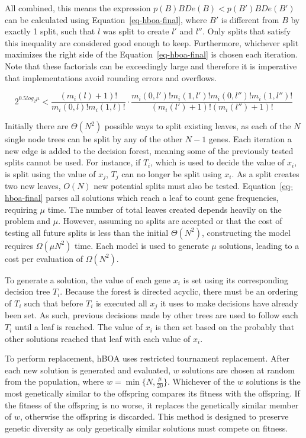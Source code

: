 \documentclass[twoside]{article}
\begin{document}
All combined, this means the expression $p(B)BDe(B) < p(B')BDe(B')$ can be calculated using Equation~\ref{eq-hboa-final},
where $B'$ is different from $B$ by exactly 1 split, such that $l$ was split to create $l'$ and $l''$. Only splits that
satisfy this inequality are considered good enough to keep. Furthermore, whichever split maximizes the right side of the
Equation~\ref{eq-hboa-final} is chosen each iteration. Note that these factorials can be exceedingly large and
therefore it is imperative that implementations avoid rounding errors and overflows.

\begin{equation}
  2^{0.5 log_2\mu} < \frac{(m_i(l) + 1)!}{m_i(0, l)!m_i(1,l)!} \cdot
  \frac{m_i(0, l')!m_i(1,l')!m_i(0, l'')!m_i(1,l'')!}{(m_i(l') + 1)!(m_i(l'') + 1)!}
  \label{eq-hboa-final}
\end{equation}

Initially there are $\Theta(N^2)$ possible ways to split existing leaves, as each of the $N$ single node
trees can be split by any of the other $N-1$ genes. Each iteration a new edge is added to the decision
forest, meaning some of the previously tested splits cannot be used. For instance, if $T_i$, which is used
to decide the value of $x_i$, is split using the value of $x_j$, $T_j$ can no longer be split using $x_i$.
As a split creates two new leaves, $O(N)$ new potential splits must also be tested. Equation~\ref{eq-hboa-final}
parses all solutions which reach a leaf to count gene frequencies, requiring $\mu$ time.
The number of total leaves created depends heavily on the problem and $\mu$.
However, assuming no splits are accepted or that the cost of testing all future splits is less than
the initial $\Theta(N^2)$, constructing the model requires $\Omega(\mu N^2)$ time. Each
model is used to generate $\mu$ solutions, leading to a cost per evaluation of $\Omega(N^2)$.

To generate a solution, the value of each gene $x_i$ is set using its corresponding decision tree $T_i$. Because
the forest is directed acyclic, there must be an ordering of $T_i$ such that before $T_i$ is executed all
$x_j$ it uses to make decisions have already been set. As such, previous decisions made by other trees
are used to follow each $T_i$ until a leaf is reached. The value of $x_i$ is then set based on the
probably that other solutions reached that leaf with each value of $x_i$.

To perform replacement, hBOA uses restricted tournament replacement. After each new solution is generated
and evaluated, $w$ solutions are chosen at random from the population, where $w=\min\{N, \frac{\mu}{20}\}$.
Whichever of the $w$ solutions is the most genetically similar to the offspring compares its fitness with the offspring.
If the fitness of the offspring is no worse, it replaces the genetically similar member of $w$, otherwise the
offspring is discarded. This method is designed to preserve genetic diversity as only genetically similar
solutions must compete on fitness.
\end{document}
